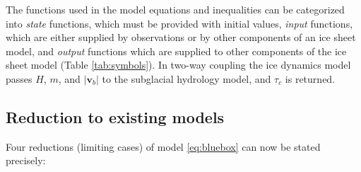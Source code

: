 \documentclass[gmd]{copernicus}   %
\newcommand\bv{\mathbf{v}}
\begin{document}
The functions used in the model equations and inequalities can be categorized into \emph{state} functions, which must be provided with initial values, \emph{input} functions, which are either supplied by observations or by other components of an ice sheet model, and \emph{output} functions which are supplied to other components of the ice sheet model (Table \ref{tab:symbols}).  In two-way coupling the ice dynamics model passes $H$, $m$, and $|\bv_b|$ to the subglacial hydrology model, and $\tau_c$ is returned.

\subsection{Reduction to existing models}  Four reductions (limiting cases) of model \eqref{eq:bluebox} can now be stated precisely:
\end{document}
